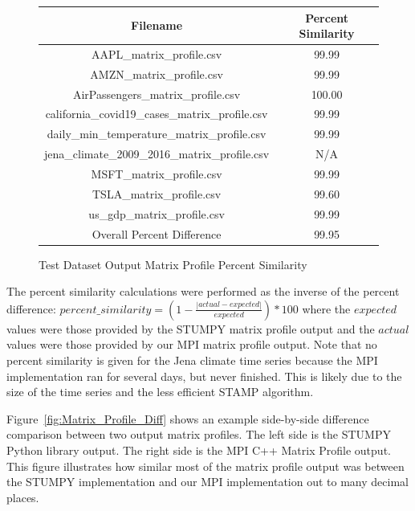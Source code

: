 \documentclass[conference]{IEEEtran}
\begin{document}
\begin{figure}
\begin{center}
\caption{Test Dataset Output Matrix Profile Percent Similarity}
\begin{tabular}{|c|c|}
\hline
\textbf{Filename} & \textbf{Percent Similarity} \\ \hline \hline
AAPL\_matrix\_profile.csv & 99.99 \\ \hline
AMZN\_matrix\_profile.csv & 99.99 \\ \hline
AirPassengers\_matrix\_profile.csv & 100.00 \\ \hline
california\_covid19\_cases\_matrix\_profile.csv & 99.99 \\ \hline
daily\_min\_temperature\_matrix\_profile.csv & 99.99 \\ \hline
jena\_climate\_2009\_2016\_matrix\_profile.csv & N/A \\ \hline
MSFT\_matrix\_profile.csv & 99.99 \\ \hline
TSLA\_matrix\_profile.csv & 99.60 \\ \hline
us\_gdp\_matrix\_profile.csv & 99.99 \\ \hline \hline
Overall Percent Difference & 99.95 \\ \hline
\hline
\end{tabular}
\label{fig:Matrix_Profile_Percent_Similarity}
\end{center}
\end{figure}

The percent similarity calculations were performed as the inverse of the percent difference: $percent\_similarity = \left(1 - \frac{|actual - expected|}{expected}\right) * 100$ where the $expected$ values were those provided by the STUMPY matrix profile output and the $actual$ values were those provided by our MPI matrix profile output. Note that no percent similarity is given for the Jena climate time series because the MPI implementation ran for several days, but never finished.  This is likely due to the size of the time series and the less efficient STAMP algorithm.

Figure~\ref{fig:Matrix_Profile_Diff} shows an example side-by-side difference comparison between two output matrix profiles.  The left side is the STUMPY Python library output.  The right side is the MPI C++ Matrix Profile output.  This figure illustrates how similar most of the matrix profile output was between the STUMPY implementation and our MPI implementation out to many decimal places.
\end{document}
